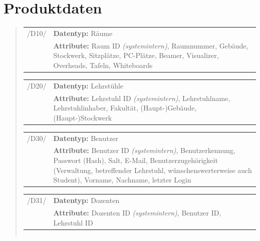 \section{Produktdaten}
\label{sec:Produktdaten}

\begin{quote}
\begin{tabular}{p{1.5cm}p{14.5cm}}


	 /D10/	& \textbf{Datentyp:} Räume \\
				& \textbf{Attribute:} Raum ID \textsl{(systemintern)}, Raumnummer, Gebäude, Stockwerk, Sitzplätze, PC-Plätze, Beamer, Visualizer, Overheads, Tafeln, Whiteboards  \\[0.25cm]

\end{tabular}


\begin{tabular}{p{1.5cm}p{14.5cm}}
		
	 /D20/	& \textbf{Datentyp:} Lehrstühle \\
				& \textbf{Attribute:} Lehrstuhl ID \textsl{(systemintern)}, Lehrstuhlname, Lehrstuhlinhaber, Fakultät, (Haupt-)Gebäude, (Haupt-)Stockwerk  \\[0.25cm]

\end{tabular}


\begin{tabular}{p{1.5cm}p{14.5cm}}
					
	 /D30/	& \textbf{Datentyp:} Benutzer \\
				& \textbf{Attribute:} Benutzer ID \textsl{(systemintern)}, Benutzerkennung, Passwort (Hash), Salt, E-Mail, Benutzerzugehörigkeit (Verwaltung, betreffender Lehrstuhl, wünschenswerterweise auch Student), Vorname, Nachname, letzter Login  \\[0.25cm]

\end{tabular}


\begin{tabular}{p{1.5cm}p{14.5cm}}
					
	 /D31/	& \textbf{Datentyp:} Dozenten \\
				& \textbf{Attribute:} Dozenten ID \textsl{(systemintern)}, Benutzer ID, Lehrstuhl ID  \\[0.25cm]

\end{tabular}


\begin{tabular}{p{1.5cm}p{14.5cm}}
	

\end{tabular}
\end{quote}
